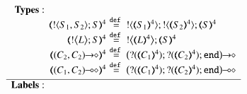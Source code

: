 \begin{figure}[t]
\small
\[
\begin{array}{rcl}
{\bf Types:}\hspace{2.2cm}\\
		\tmap{\btout{S_1, S_2}S}{4}
		&\!\!\!\!\defeq\!\!\!\!&
		\btout{\tmap{S_1}{4}}  \btout{\tmap{S_2}{4}}\tmap{S}{4}
		\\
		\tmap{\bbtout{L} S}{4}
		&\!\!\!\!\defeq\!\!\!\!&
		\bbtout{\mapt{L}^{4}}\mapt{S}^{4}
		\\
		\tmap{\shot{(C_2,  C_2)}}{4}
		&\!\!\!\!\defeq\!\!\!\!&
		\shot{\big(\btinp{\tmap{C_1}{4}}  \btinp{\tmap{C_2}{4}}\tinact\big)}
		\\
		\tmap{\lhot{(C_1,  C_2)}}{4}
		&\!\!\!\!\defeq\!\!\!\!&
		\lhot{\big(\btinp{\tmap{C_1}{4}}  \btinp{\tmap{C_2}{4}}\tinact\big)}
		\\[1mm]
\hline
{\bf Labels:}\hspace{2.2cm}\\

\end{array}\]
\end{figure}
